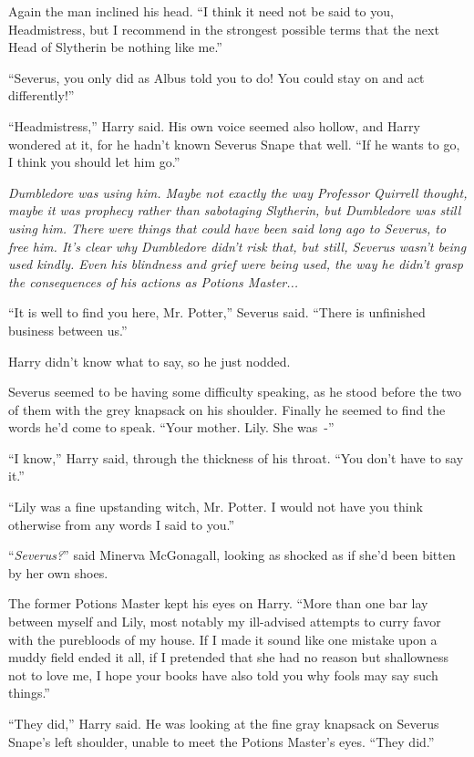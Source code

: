 Again the man inclined his head. ``I think it need not be said to you, Headmistress, but I recommend in the strongest possible terms that the next Head of Slytherin be nothing like me.''

``Severus, you only did as Albus told you to do! You could stay on and act differently!''

``Headmistress,'' Harry said. His own voice seemed also hollow, and Harry wondered at it, for he hadn't known Severus Snape that well. ``If he wants to go, I think you should let him go.''

\emph{Dumbledore was using him. Maybe not exactly the way Professor Quirrell thought, maybe it was prophecy rather than sabotaging Slytherin, but Dumbledore was still using him. There were things that could have been said long ago to Severus, to free him. It's clear why Dumbledore didn't risk that, but still, Severus wasn't being used kindly. Even his blindness and grief were being used, the way he didn't grasp the consequences of his actions as Potions Master...}

``It is well to find you here, Mr. Potter,'' Severus said. ``There is unfinished business between us.''

Harry didn't know what to say, so he just nodded.

Severus seemed to be having some difficulty speaking, as he stood before the two of them with the grey knapsack on his shoulder. Finally he seemed to find the words he'd come to speak. ``Your mother. Lily. She was~-''

``I know,'' Harry said, through the thickness of his throat. ``You don't have to say it.''

``Lily was a fine upstanding witch, Mr. Potter. I would not have you think otherwise from any words I said to you.''

``\emph{Severus?}'' said Minerva McGonagall, looking as shocked as if she'd been bitten by her own shoes.

The former Potions Master kept his eyes on Harry. ``More than one bar lay between myself and Lily, most notably my ill-advised attempts to curry favor with the purebloods of my house. If I made it sound like one mistake upon a muddy field ended it all, if I pretended that she had no reason but shallowness not to love me, I hope your books have also told you why fools may say such things.''

``They did,'' Harry said. He was looking at the fine gray knapsack on Severus Snape's left shoulder, unable to meet the Potions Master's eyes. ``They did.''


